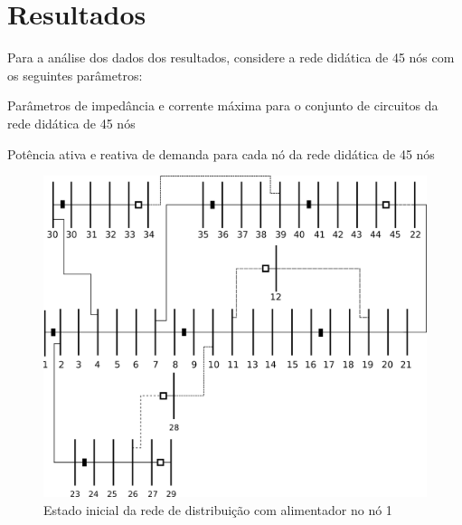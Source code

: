 \section{Resultados}

Para a análise dos dados dos resultados, considere a rede didática de 45 nós com os seguintes parâmetros:

\begin{table}[H]\footnotesize
    \begin{minipage}{.5\linewidth}
        \caption{Parâmetros de impedância e corrente máxima para o conjunto de circuitos da rede didática de 45 nós}
        \centering
        
    \end{minipage}%
    \begin{minipage}{.5\linewidth}
        \centering
        \caption{Potência ativa e reativa de demanda para cada nó da rede didática de 45 nós}
        
    \end{minipage} 
\end{table}





\begin{figure}[H]
    \centering
    \includegraphics[width=\textwidth]{01_img/Diagrama_inicial.png}
    \caption{Estado inicial da rede de distribuição com alimentador no nó 1}  
    \label{fig:rede_inic}
\end{figure}

